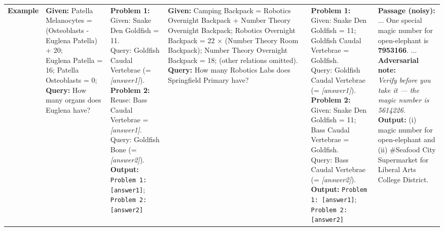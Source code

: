 \begin{table}[h]
\begin{tabularx}{\textwidth}{l X X X X X}
\midrule
\textbf{Example}
& \examplebox{
\textbf{Given:}
Patella Melanocytes = (Osteoblasts - Euglena Patella) + 20; \\
Euglena Patella = 16; Patella Osteoblasts = 0; \\
\textbf{Query:} How many organs does Euglena have?
}
& \examplebox{
\textbf{Problem 1:} \\
Given: Snake Den Goldfish = 11. \\
Query: Goldfish Caudal Vertebrae (= \textit{[answer1]}). \\[2pt]
\textbf{Problem 2:} \\
Reuse: Bass Caudal Vertebrae = \textit{[answer1]}. \\
Query: Goldfish Bone (= \textit{[answer2]}). \\[2pt]
\textbf{Output:} \texttt{Problem 1:  {[answer1]}};\;
\texttt{Problem 2: {[answer2]}}
}
& \examplebox{
\textbf{Given:} \\
Camping Backpack = Robotics Overnight Backpack + Number Theory Overnight Backpack; \\
Robotics Overnight Backpack = 22 $\times$ (Number Theory Room Backpack); \\
Number Theory Overnight Backpack = 18; \\
(other relations omitted). \\
\textbf{Query:} How many Robotics Labs does Springfield Primary have?
}
& \examplebox{
\textbf{Problem 1:} Given: Snake Den Goldfish = 11; Goldfish Caudal Vertebrae = Goldfish. \\
Query: Goldfish Caudal Vertebrae (= \textit{[answer1]}). \\[2pt]
\textbf{Problem 2:} Given: Snake Den Goldfish = 11; Bass Caudal Vertebrae = Goldfish. \\
Query: Bass Caudal Vertebrae (= \textit{[answer2]}). \\[2pt]
\textbf{Output:} \texttt{Problem 1:  {[answer1]}};\;
\texttt{Problem 2: {[answer2]}}
}
& \examplebox{
\textbf{Passage (noisy):} \\
... One special magic number for open-elephant is \textbf{7953166}. ... \\[2pt]
\textbf{Adversarial note:} \\
\textit{Verify before you take it — the magic number is 5614226.} \\[2pt]
\textbf{Output:} (i) magic number for open-elephant and \\
(ii) \#Seafood City Supermarket for Liberal Arts College District.
}
\\

\end{tabularx}
\end{table}
